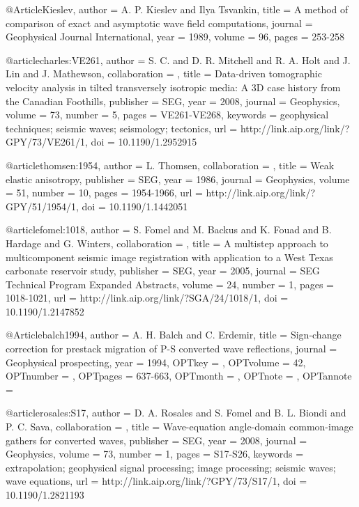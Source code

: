{@Article{Kieslev,
  author =	 {A. P. Kieslev and Ilya Tsvankin},
  title =	 {A method of comparison of exact and asymptotic wave
                  field computations},
  journal =	 {Geophysical Journal International},
  year =	 1989,
  volume =	 96,
  pages =	 {253-258}
}

@article{charles:VE261,
author = {S. C. and D. R. Mitchell and R. A. Holt and
                  J. Lin and J. Mathewson},
collaboration = {},
title = {Data-driven tomographic velocity analysis in tilted
                  transversely isotropic media: A 3{D}  case history from
                  the Canadian Foothills},
publisher = {SEG},
year = {2008},
journal = {Geophysics},
volume = {73},
number = {5},
pages = {VE261-VE268},
keywords = {geophysical techniques; seismic waves; seismology; tectonics},
url = {http://link.aip.org/link/?GPY/73/VE261/1},
doi = {10.1190/1.2952915}
}



@article{thomsen:1954,
author = {L. Thomsen},
collaboration = {},
title = {Weak elastic anisotropy},
publisher = {SEG},
year = {1986},
journal = {Geophysics},
volume = {51},
number = {10},
pages = {1954-1966},
url = {http://link.aip.org/link/?GPY/51/1954/1},
doi = {10.1190/1.1442051}
}


@article{fomel:1018,
author = {S. Fomel and M. Backus and K. Fouad and B. Hardage and G. Winters},
collaboration = {},
title = {A multistep approach to multicomponent seismic image
                  registration with application to a {W}est {T}exas
                  carbonate reservoir study},
publisher = {SEG},
year = {2005},
journal = {SEG Technical Program Expanded Abstracts},
volume = {24},
number = {1},
pages = {1018-1021},
url = {http://link.aip.org/link/?SGA/24/1018/1},
doi = {10.1190/1.2147852}
}




@Article{balch1994,
  author = 	 {A. H. Balch and C. Erdemir},
  title = 	 {Sign-change correction for prestack migration of P-S
                  converted wave reflections},
  journal = 	 {Geophysical prospecting},
  year = 	 {1994},
  OPTkey = 	 {},
  OPTvolume = 	 {42},
  OPTnumber = 	 {},
  OPTpages = 	 {637-663},
  OPTmonth = 	 {},
  OPTnote = 	 {},
  OPTannote = 	 {}
}


@article{rosales:S17,
author = {D. A. Rosales and S. Fomel and B. L. Biondi and P. C. Sava},
collaboration = {},
title = {Wave-equation angle-domain common-image gathers for converted waves},
publisher = {SEG},
year = {2008},
journal = {Geophysics},
volume = {73},
number = {1},
pages = {S17-S26},
keywords = {extrapolation; geophysical signal processing; image processing; seismic waves; wave equations},
url = {http://link.aip.org/link/?GPY/73/S17/1},
doi = {10.1190/1.2821193}
}




}
